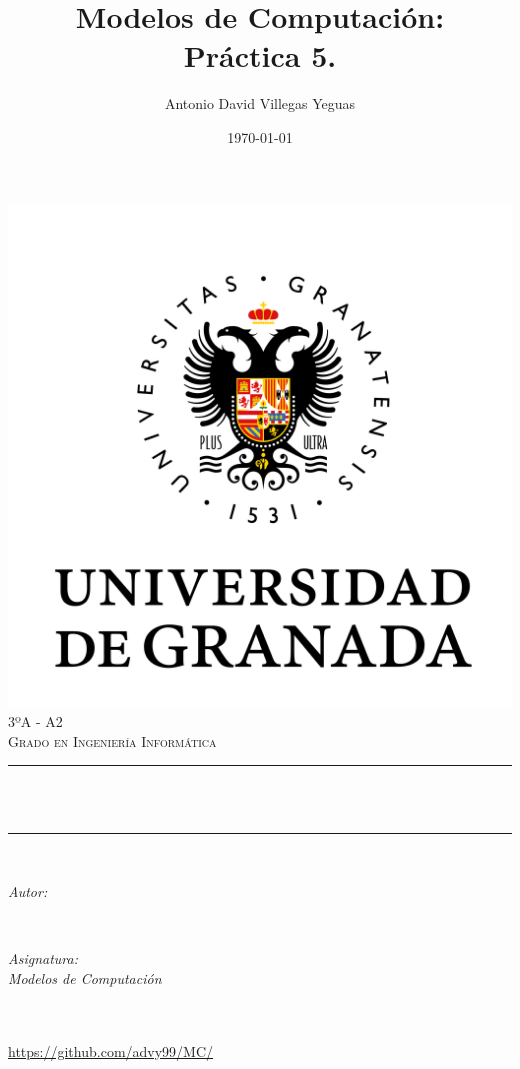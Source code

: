 \documentclass[12pt, spanish]{article}
\title{Modelos de Computación:\\
Práctica 5. \hspace{0.05cm} }
\author{Antonio David Villegas Yeguas}
\date{\today}
\makeatletter
\let\thetitle\@title
\let\theauthor\@author
\let\thedate\@date
\makeatother
\begin{document}

\begin{titlepage}
    \centering
    \vspace*{0.5 cm}
    \includegraphics[scale = 0.50]{ugr.png}\\[1.0 cm]
    \textsc{\large 3ºA - A2}\\[0.5 cm]            
    \textsc{\large Grado en Ingeniería Informática}\\[0.5 cm]              
    \rule{\linewidth}{0.2 mm} \\[0.2 cm]
    { \huge \bfseries \thetitle}\\
    \rule{\linewidth}{0.2 mm} \\[1 cm]
    
    \begin{minipage}{0.4\textwidth}
        \begin{flushleft} \large
            \emph{Autor:}\\
            \theauthor
            \end{flushleft}
            \end{minipage}~
            \begin{minipage}{0.4\textwidth}
            \begin{flushright} \large
            \emph{Asignatura: \\
            Modelos de Computación}                   
        \end{flushright}
    \end{minipage}\\[0.5cm]
  
    {\large \thedate}\\[0.5cm]
    {\url{https://github.com/advy99/MC/}}
    {\doclicenseThis}
 	
    \vfill
    
\end{titlepage}
\end{document}
